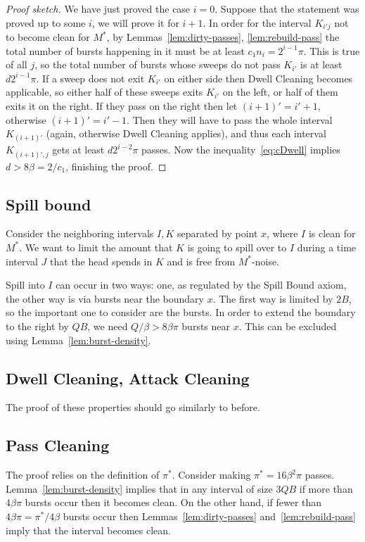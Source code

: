 \documentclass[12pt]{memoir}
\def\B{B}
\newcommand{\Q}{Q}
\begin{document}
\begin{proof}[Proof sketch]
We have just proved the case \( i=0 \).
Suppose that the statement was proved up to some \( i \), we will prove it for \( i+1 \).
In order for the interval \( K_{i'j} \) not to become clean for \( M^{*} \), 
by Lemmas~\ref{lem:dirty-passes}, \ref{lem:rebuild-pass}
the total number of bursts happening in it must be at least \( c_{1} n_{i} = 2^{i-1}\pi \).
This is true of all \( j \), so the total number of bursts whose sweeps do not pass \( K_{i'} \)
is at least \( d 2^{i-1}\pi \).
If a sweep does not exit \( K_{i'} \) on either side then Dwell Cleaning becomes applicable,
so either half of these sweeps exits \( K_{i'} \) on the left, or half of them exits it on the right.
If they pass on the right then let \( (i+1)'=i'+1 \), otherwise \( (i+1)'=i'-1 \).
Then they will have to pass the whole interval \( K_{(i+1)'} \) (again, otherwise Dwell Cleaning
applies), and thus each interval \( K_{(i+1)',j} \) gets at least \( d 2^{i-2}\pi \) passes.
Now the inequality~\eqref{eq:cDwell} implies \( d > 8\beta=2/c_{1} \), finishing the proof.
\end{proof}


\subsection{Spill bound}

Consider the neighboring intervals \( I,K \) separated by point \( x \),
where \( I \) is clean for \( M^{*} \).
We want to limit the amount that \( K \) is going to spill over to \( I \) during a time
interval \( J \) that the head spends in \( K \) and is free from \( M^{*} \)-noise.

Spill into \( I \) can occur in two ways: 
one, as regulated by the Spill Bound axiom, the other way is via bursts near the boundary \( x \).
The first way is limited by \( 2\B \), so the important one to consider are the bursts.
In order to extend the boundary to the right by \( \Q\B \),
we need \( \Q/\beta > 8\beta\pi \) bursts near \( x \).
This can be excluded using Lemma~\ref{lem:burst-density}.

\subsection{Dwell Cleaning, Attack Cleaning}

The proof of these properties should go similarly to before.

\subsection{Pass Cleaning}

The proof relies on the definition of \( \pi^{*} \).
Consider making \( \pi^{*}=16\beta^{2}\pi \) passes.
Lemma~\ref{lem:burst-density} implies that in any interval of size \( 3\Q\B \)
if more than \( 4\beta\pi \) bursts occur then it becomes clean.
On the other hand, if fewer than \( 4\beta\pi=\pi^{*}/4\beta \) bursts occur then
Lemmas~\ref{lem:dirty-passes} and~\ref{lem:rebuild-pass} imply that the
interval becomes clean.
\end{document}
